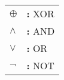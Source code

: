 \begin{tabular}{@{}p{2cm}l}
{$\boldsymbol\oplus$} & {\bf:} XOR\\
{$\boldsymbol\land$} & {\bf:} AND\\
{$\boldsymbol\lor$} & {\bf:} OR\\
{$\boldsymbol\lnot$} & {\bf:} NOT\\
\end{tabular}

